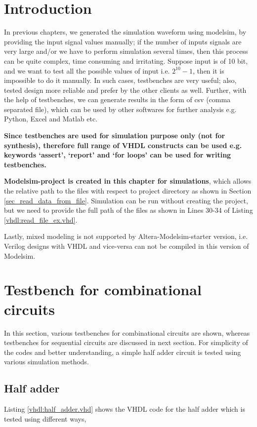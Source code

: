 \section{Introduction}

In previous chapters, we generated the simulation waveform using modelsim, by providing the input signal values manually; if the number of inputs signals are very large and/or we have to perform simulation several times, then this process can be quite complex, time consuming and irritating. Suppose input is of 10 bit, and we want to test all the possible values of input i.e. $2^{10}-1$, then it is impossible to do it manually. In such cases, testbenches are very useful; also, tested design more reliable and prefer by the other clients as well. Further, with the help of testbenches, we can generate results in the form of csv (comma separated file), which can be used by other softwares for further analysis e.g. Python, Excel and Matlab etc.  

\textbf{Since testbenches are used for simulation purpose only (not for synthesis), therefore full range of VHDL constructs can be used e.g. keywords `assert', `report' and `for loops' can be used for writing testbenches.}

\textbf{Modelsim-project is created in this chapter for simulations}, which allows the relative path to the files with respect to project directory as shown in Section \ref{sec_read_data_from_file}. Simulation can be run without creating the project, but we need to provide the full path of the files as shown in Lines 30-34 of Listing \ref{vhdl:read_file_ex.vhd}. 

Lastly, mixed modeling is not supported by Altera-Modelsim-starter version, i.e. Verilog designs with VHDL and vice-versa can not be compiled in this version of Modelsim. 

\section{Testbench for combinational circuits}

In this section, various testbenches for combinational circuits are shown, whereas testbenches for sequential circuits are discussed in next section. For simplicity of the codes and better understanding, a simple half adder circuit is tested using various simulation methods. 

\subsection{Half adder}
Listing \ref{vhdl:half_adder.vhd} shows the VHDL code for the half adder which is tested using different ways, 

